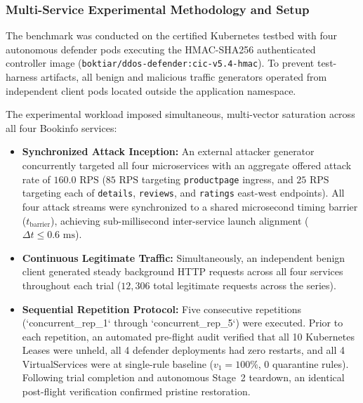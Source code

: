 \subsubsection{Multi-Service Experimental Methodology and Setup}

The benchmark was conducted on the certified Kubernetes testbed with four autonomous defender pods executing the HMAC-SHA256 authenticated controller image (\texttt{boktiar/ddos-defender:cic-v5.4-hmac}). To prevent test-harness artifacts, all benign and malicious traffic generators operated from independent client pods located outside the application namespace.

The experimental workload imposed simultaneous, multi-vector saturation across all four Bookinfo services:
\begin{itemize}
    \item \textbf{Synchronized Attack Inception:} An external attacker generator concurrently targeted all four microservices with an aggregate offered attack rate of $160.0\text{ RPS}$ ($85\text{ RPS}$ targeting \texttt{productpage} ingress, and $25\text{ RPS}$ targeting each of \texttt{details}, \texttt{reviews}, and \texttt{ratings} east-west endpoints). All four attack streams were synchronized to a shared microsecond timing barrier ($t_{\text{barrier}}$), achieving sub-millisecond inter-service launch alignment ($\Delta t \le 0.6\text{ ms}$).
    \item \textbf{Continuous Legitimate Traffic:} Simultaneously, an independent benign client generated steady background HTTP requests across all four services throughout each trial ($12{,}306$ total legitimate requests across the series).
    \item \textbf{Sequential Repetition Protocol:} Five consecutive repetitions (`concurrent\_rep\_1` through `concurrent\_rep\_5`) were executed. Prior to each repetition, an automated pre-flight audit verified that all 10 Kubernetes Leases were unheld, all 4 defender deployments had zero restarts, and all 4 VirtualServices were at single-rule baseline ($v_1=100\%$, 0 quarantine rules). Following trial completion and autonomous Stage~2 teardown, an identical post-flight verification confirmed pristine restoration.
\end{itemize}

